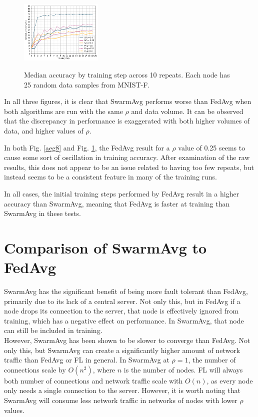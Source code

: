 \documentclass[letterpaper, 10 pt, conference]{ieeeconf}  %
\begin{document}
\begin{figure}[H] 
	 \\
	\includegraphics[width=0.35\textwidth]{conf_sparse_ns25_cl3}
	\caption{Median accuracy by training step across 10 repeats. Each node has 25 random data samples from MNIST-F.}
	\label{aeg9}
\end{figure}

In all three figures, it is clear that SwarmAvg performs worse than FedAvg when both algorithms are run with the same $\rho$ and data volume. It can be observed that the discrepancy in performance is exaggerated with both higher volumes of data, and higher values of $\rho$.

In both Fig. \ref{aeg8} and Fig. \ref{aeg9}, the FedAvg result for a $\rho$ value of 0.25 seems to cause some sort of oscillation in training accuracy. After examination of the raw results, this does not appear to be an issue related to having too few repeats, but instead seems to be a consistent feature in many of the training runs.

In all cases, the initial training steps performed by FedAvg result in a higher accuracy than SwarmAvg, meaning that FedAvg is faster at training than SwarmAvg in these tests.

\section{Comparison of SwarmAvg to FedAvg}
SwarmAvg has the significant benefit of being more fault tolerant than FedAvg, primarily due to its lack of a central server. Not only this, but in FedAvg if a node drops its connection to the server, that node is effectively ignored from training, which has a negative effect on performance. In SwarmAvg, that node can still be included in training. \\

However, SwarmAvg has been shown to be slower to converge than FedAvg. Not only this, but SwarmAvg can create a significantly higher amount of network traffic than FedAvg or FL in general. In SwarmAvg at $\rho=1$, the number of connections scale by $O(n^2)$, where $n$ is the number of nodes. FL will always both number of connections and network traffic scale with $O(n)$, as every node only needs a single connection to the server. However, it is worth noting that SwarmAvg will consume less network traffic in networks of nodes with lower $\rho$ values. \\
\end{document}
